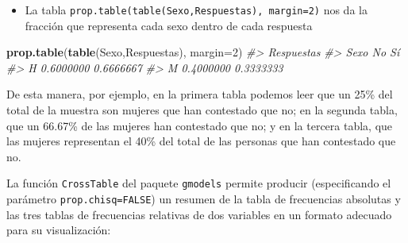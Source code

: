 \documentclass[
]{book}
\newenvironment{Shaded}{\begin{snugshade}}{\end{snugshade}}
\newcommand{\CommentTok}[1]{\textcolor[rgb]{0.56,0.35,0.01}{\textit{#1}}}
\newcommand{\DataTypeTok}[1]{\textcolor[rgb]{0.13,0.29,0.53}{#1}}
\newcommand{\DecValTok}[1]{\textcolor[rgb]{0.00,0.00,0.81}{#1}}
\newcommand{\KeywordTok}[1]{\textcolor[rgb]{0.13,0.29,0.53}{\textbf{#1}}}
\newcommand{\NormalTok}[1]{#1}
\providecommand{\tightlist}{%
  \setlength{\itemsep}{0pt}\setlength{\parskip}{0pt}}
\theoremstyle{definition}
\theoremstyle{definition}
\theoremstyle{definition}
\theoremstyle{remark}
\begin{document}
\begin{itemize}
\tightlist
\item
  La tabla \texttt{prop.table(table(Sexo,Respuestas),\ margin=2)} nos da la fracción que representa cada sexo dentro de cada respuesta
\end{itemize}

\begin{Shaded}
\begin{Highlighting}[]
\KeywordTok{prop.table}\NormalTok{(}\KeywordTok{table}\NormalTok{(Sexo,Respuestas), }\DataTypeTok{margin=}\DecValTok{2}\NormalTok{)}
\CommentTok{\#\textgreater{}     Respuestas}
\CommentTok{\#\textgreater{} Sexo        No        Sí}
\CommentTok{\#\textgreater{}    H 0.6000000 0.6666667}
\CommentTok{\#\textgreater{}    M 0.4000000 0.3333333}
\end{Highlighting}
\end{Shaded}

De esta manera, por ejemplo, en la primera tabla podemos leer que un 25\% del total de la muestra son mujeres que han contestado que no; en la segunda tabla, que un 66.67\% de las mujeres han contestado que no; y en la tercera tabla, que las mujeres representan el 40\% del total de las personas que han contestado que no.

La función \texttt{CrossTable} del paquete \texttt{gmodels} permite producir (especificando el parámetro \texttt{prop.chisq=FALSE}) un resumen de la tabla de frecuencias absolutas y las tres tablas de frecuencias relativas de dos variables en un formato adecuado para su visualización:
\end{document}
